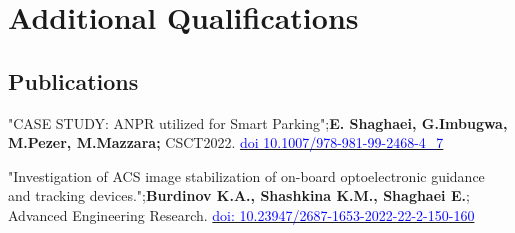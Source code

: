 \section{Additional Qualifications}

\renewcommand{\labelitemi}{o}

\subsection{\textbf{{Publications}}}
	
    {"CASE STUDY: ANPR utilized for Smart Parking";\textbf{E. Shaghaei, G.Imbugwa, M.Pezer, M.Mazzara;} CSCT2022. \href{https://doi.org/10.1007/978-981-99-2468-4_7}{\textcolor{blue}{doi 10.1007/978-981-99-2468-4\_7}}}
    
    
    {"Investigation of ACS image stabilization of on-board optoelectronic guidance and tracking devices.";\textbf{Burdinov K.A., Shashkina K.M., Shaghaei E.};   Advanced Engineering Research. \href{https://doi.org/10.23947/2687-1653-2022-22-2-150-160}{\textcolor{blue}{doi: 10.23947/2687-1653-2022-22-2-150-160}}}
    

	

